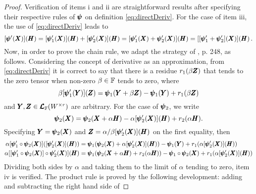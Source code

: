 {\footnotesize
\begin{proof}
Verification of items i and ii are straightforward results after specifying their respective rules of $\pmb{\psi}$ on definition \eqref{eq:directDeriv}. For the case of item iii, the use of \eqref{eq:directDeriv} leads to
\begin{equation*}
[\pmb{\psi}'(\pmb{X})](\pmb{H}) = [\pmb{\psi}_1'(\pmb{X})](\pmb{H}) + [\pmb{\psi}'_2(\pmb{X})](\pmb{H}) = [\pmb{\psi}'_1(\pmb{X})+\pmb{\psi}'_2(\pmb{X})](\pmb{H})=[[\pmb{\psi}'_1+\pmb{\psi}'_2](\pmb{X})](\pmb{H})\,.
\end{equation*}
Now, in order to prove the chain rule, we adapt the strategy of \cite{zeidler_1995_1}, p. 248, as follows. Considering the concept of derivative as an approximation, from \eqref{eq:directDeriv} it is correct to say that there is a residue $r_1(\beta\pmb{Z})$ that tends to the zero tensor when non-zero $\beta\in\mathbb{F}$ tends to zero, where
\begin{equation*}
\beta[\pmb{\psi}'_1(\pmb{Y})](\pmb{Z})=\pmb{\psi}_1(\pmb{Y}+\beta\pmb{Z})-\pmb{\psi}_1(\pmb{Y})+r_1(\beta\pmb{Z})
\end{equation*}
and $\pmb{Y},\pmb{Z}\in\pmb{\mathcal{L}}_{\mathbb{F}}(W^{\times r})$ are arbitrary. For the case of $\pmb{\psi}_2$, we write
\begin{equation*}
\pmb{\psi}_2(\pmb{X})=\pmb{\psi}_2(\pmb{X}+\alpha\pmb{H})-\alpha[\pmb{\psi}'_2(\pmb{X})](\pmb{H})+r_2(\alpha\pmb{H}).
\end{equation*}
Specifying $\pmb{Y}=\pmb{\psi}_2(\pmb{X})$ and $\pmb{Z}=\alpha/\beta[\pmb{\psi}'_2(\pmb{X})](\pmb{H})$ on the first equality, then
\begin{align*}
	\alpha[\pmb{\psi}'_1\circ\pmb{\psi}_2(\pmb{X})]([\pmb{\psi}'_2(\pmb{X})](\pmb{H}))&=\pmb{\psi}_1(\pmb{\psi}_2(\pmb{X})+\alpha[\pmb{\psi}'_2(\pmb{X})](\pmb{H}))-\pmb{\psi}_1(\pmb{Y})+r_1(\alpha[\pmb{\psi}'_2(\pmb{X})](\pmb{H}))\\
	\alpha[[\pmb{\psi}_1'\circ\pmb{\psi}_2(\pmb{X})]\circ\pmb{\psi}_2'(\pmb{X})](\pmb{H})&=\pmb{\psi}_1(\pmb{\psi}_2(\pmb{X}+\alpha\pmb{H})+r_2(\alpha\pmb{H}))-\pmb{\psi}_1\circ\pmb{\psi}_2(\pmb{X})+r_1(\alpha[\pmb{\psi}'_2(\pmb{X})](\pmb{H}))
\end{align*}
Dividing both sides by $\alpha$ and taking them to the limit of $\alpha$ tending to zero, item iv is verified. The product rule is proved by the following development: adding and subtracting the right hand side of

\end{proof}}
